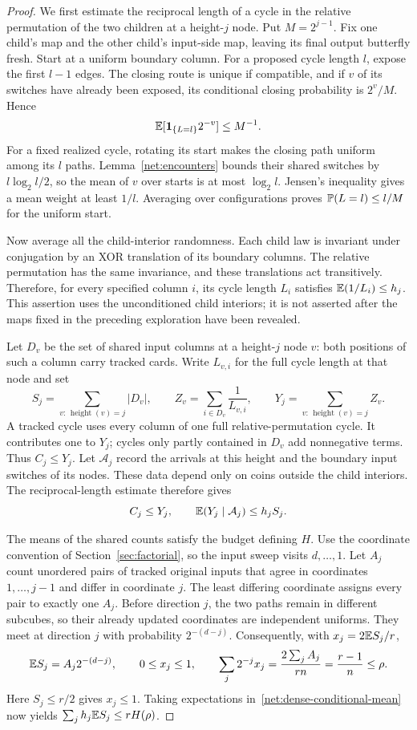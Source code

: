 \begin{proof}
We first estimate the reciprocal length of a cycle in the relative
permutation of the two children at a height-$j$ node.  Put
$M=2^{j-1}$.  Fix one child's map and the other child's input-side
map, leaving its final output butterfly fresh.  Start at a uniform
boundary column.  For a proposed cycle length $l$, expose the first
$l-1$ edges.  The closing route is unique if compatible, and if $v$
of its switches have already been exposed, its conditional closing
probability is $2^v/M$.  Hence
\[
 \mathbb E[\mathbf1_{\{L=l\}}2^{-v}]\le M^{-1}.
\]
For a fixed realized cycle, rotating its start makes the closing
path uniform among its $l$ paths.  Lemma~\ref{net:encounters}
bounds their shared switches by $l\log_2l/2$, so the mean of $v$
over starts is at most $\log_2l$.  Jensen's inequality gives a
mean weight at least $1/l$.  Averaging over configurations proves
$\mathbb P(L=l)\le l/M$ for the uniform start.

Now average all the child-interior randomness.  Each child law is
invariant under conjugation by an XOR translation of its boundary
columns.  The relative permutation has the same invariance, and
these translations act transitively.  Therefore, for every specified
column $i$, its cycle length $L_i$ satisfies
$\mathbb E(1/L_i)\le h_j$.  This assertion uses the unconditioned child
interiors; it is not asserted after the maps fixed in the preceding
exploration have been revealed.

Let $D_v$ be the set of shared input columns at a height-$j$ node $v$:
both positions of such a column carry tracked cards.  Write $L_{v,i}$
for the full cycle length at that node and set
\[
 S_j=\sum_{v:\,\operatorname{height}(v)=j}|D_v|,
 \qquad Z_v=\sum_{i\in D_v}\frac1{L_{v,i}},
 \qquad Y_j=\sum_{v:\,\operatorname{height}(v)=j}Z_v.
\]
A tracked cycle uses every column of one full relative-permutation
cycle.  It contributes one to $Y_j$; cycles only partly contained
in $D_v$ add nonnegative terms.  Thus $C_j\le Y_j$.
Let $\mathcal A_j$ record the arrivals at this height and the
boundary input switches of its nodes.  These data depend only on
coins outside the child interiors.  The reciprocal-length estimate
therefore gives
\begin{equation}\label{net:dense-conditional-mean}
 C_j\le Y_j,\qquad
 \mathbb E(Y_j\mid\mathcal A_j)\le h_j S_j.
\end{equation}

The means of the shared counts satisfy the budget defining $H$.
Use the coordinate convention of Section~\ref{sec:factorial}, so
the input sweep visits $d,\ldots,1$.  Let $A_j$ count unordered
pairs of tracked original inputs that agree in coordinates
$1,\ldots,j-1$ and differ in coordinate $j$.  The least differing
coordinate assigns every pair to exactly one $A_j$.  Before
direction $j$, the two paths remain in different subcubes, so their
already updated coordinates are independent uniforms.  They meet
at direction $j$ with probability $2^{-(d-j)}$.  Consequently, with
$x_j=2\mathbb E S_j/r$,
\[
 \mathbb E S_j=A_j2^{-(d-j)},\qquad 0\le x_j\le1,\qquad
 \sum_j2^{-j}x_j
 =\frac{2\sum_jA_j}{rn}=\frac{r-1}{n}\le\rho.
\]
Here $S_j\le r/2$ gives $x_j\le1$.  Taking expectations
in~\eqref{net:dense-conditional-mean} now yields
$\sum_j h_j\mathbb E S_j\le rH(\rho)$.


\end{proof}
